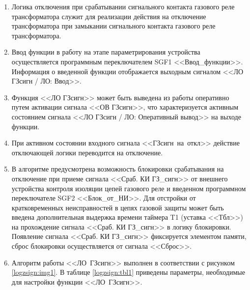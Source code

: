 \documentclass[a4paper, 12pt,table, hidelinks, DIV=calc]{extarticle} %
\begin{document}
\FloatBarrier %


\color{black}

\begin{enumerate}[label=\arabic{section}.\arabic{subsection}.\arabic*, labelsep=4pt, leftmargin=0pt, itemindent=57pt]

\item
Логика отключения при срабатывании сигнального контакта газового реле трансформатора служит для реализации действия на отключение трансформатора при замыкании сигнального контакта газового реле трансформатора. 
\item
Ввод функции в работу на этапе параметрирования устройства осуществляется программным переключателем SGF1 <<Ввод\_функции>>. Информация о введенной функции отображается выходным сигналом <<ЛО ГЗсигн / ЛО: Ввод>>.
\item
Функция <<ЛО ГЗсигн>> может быть выведена из работы оперативно путем активации сигнала <<ОВ ГЗсигн>>, что характеризуется активным состоянием сигнала <<ЛО ГЗсигн / ЛО: Оперативный вывод>> на выходе функции. 
\item
При активном состоянии входного сигнала <<ГЗсигн~на~откл>> действие отключающей логики переводится на отключение.
\item
В алгоритме предусмотрена возможность блокировки срабатывания на отключение при приеме сигнала <<Сраб. КИ ГЗ\_сигн>> от внешнего устройства контроля изоляции цепей газового реле и введенном программном переключателе SGF2 <<Блок\_от\_НИ>>. Для отстройки от кратковременных неисправностей в цепях газовой защиты может быть введена дополнительная выдержка времени таймера T1 (уставка <<Тбл>>) на прохождение сигнала <<Сраб. КИ ГЗ\_сигн>> в логику блокировки. 
Появление сигнала <<Сраб. КИ ГЗ\_сигн>> фиксируется элементом памяти, сброс блокировки осуществляется от сигнала <<Сброс>>.
\item
Алгоритм работы <<ЛО~ГЗсигн>> выполнен в соответствии с рисунком \ref{logzsign:img1}. В таблице \ref{logzsign:tbl1} приведены параметры, необходимые для настройки функции <<ЛО~ГЗсигн>>.


\end{enumerate}
\end{document}
